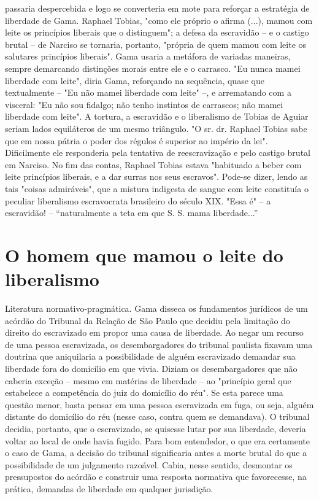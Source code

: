 {passaria despercebida e logo se converteria em mote para reforçar a
estratégia de liberdade de Gama. Raphael Tobias, "como ele próprio o
afirma (...), mamou com leite os princípios liberais que o distinguem";
a defesa da escravidão -- e o castigo brutal -- de Narciso se tornaria,
portanto, "própria de quem mamou com leite os salutares princípios
liberais". Gama usaria a metáfora de variadas maneiras, sempre
demarcando distinções morais entre ele e o carrasco. "Eu nunca mamei
liberdade com leite", diria Gama, reforçando na sequência, quase que
textualmente -- "Eu não mamei liberdade com leite" --, e arrematando com
a visceral: "Eu não sou fidalgo; não tenho instintos de carrascos; não
mamei liberdade com leite". A tortura, a escravidão e o liberalismo de
Tobias de Aguiar seriam lados equiláteros de um mesmo triângulo. "O sr.
dr. Raphael Tobias sabe que em nossa pátria o poder dos régulos é
superior ao império da lei". Dificilmente ele responderia pela tentativa
de reescravização e pelo castigo brutal em Narciso. No fim das contas,
Raphael Tobias estava "habituado a beber com leite princípios liberais,
e a dar surras nos seus escravos". Pode-se dizer, lendo as tais "coisas
admiráveis", que a mistura indigesta de sangue com leite constituía o
peculiar liberalismo escravocrata brasileiro do século XIX. "Essa é" --
a escravidão! -- ``naturalmente a teta em que S. S. mama liberdade...''}

\part{O homem que mamou o leite do liberalismo}

\pagebreak
\mbox{}\vfill
\thispagestyle{empty}

{\small\noindent
Literatura normativo-pragmática. Gama disseca os fundamentos
jurídicos de um acórdão do Tribunal da Relação de São Paulo que decidiu
pela limitação do direito do escravizado em propor uma causa de
liberdade. Ao negar um recurso de uma pessoa escravizada, os
desembargadores do tribunal paulista fixavam uma doutrina que
aniquilaria a possibilidade de alguém escravizado demandar sua liberdade
fora do domicílio em que vivia. Diziam os desembargadores que não
caberia exceção -- mesmo em matérias de liberdade -- ao "princípio geral
que estabelece a competência do juiz do domicílio do réu". Se esta
parece uma questão menor, basta pensar em uma pessoa escravizada em
fuga, ou seja, alguém distante do domicílio do réu (nesse caso, contra
quem se demandava). O tribunal decidia, portanto, que o escravizado, se
quisesse lutar por sua liberdade, deveria voltar ao local de onde havia
fugido. Para bom entendedor, o que era certamente o caso de Gama, a
decisão do tribunal significaria antes a morte brutal do que a
possibilidade de um julgamento razoável. Cabia, nesse sentido, desmontar
os pressupostos do acórdão e construir uma resposta normativa que
favorecesse, na prática, demandas de liberdade em qualquer jurisdição. }

